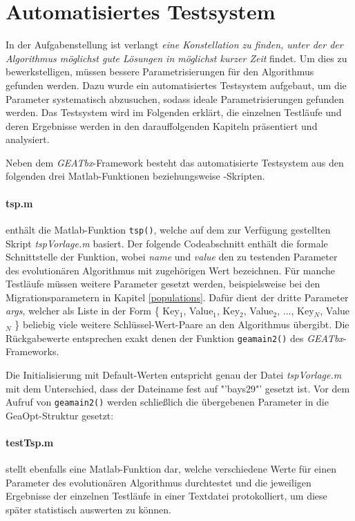 \section{Automatisiertes Testsystem}\label{testsystem}

In der Aufgabenstellung \cite{aufg} ist verlangt \emph{eine Konstellation zu finden,
unter der der Algorithmus möglichst gute Lösungen in möglichst kurzer Zeit} findet.
Um dies zu bewerkstelligen, müssen bessere Parametrisierungen für den Algorithmus
gefunden werden. Dazu wurde ein automatisiertes Testsystem aufgebaut, um
die Parameter systematisch abzusuchen, sodass ideale Parametrisierungen
gefunden werden. Das Testsystem wird im Folgenden erklärt, die einzelnen Testläufe
und deren Ergebnisse werden in den darauffolgenden Kapiteln präsentiert und
analysiert.

Neben dem \emph{GEATbx}-Framework besteht das automatisierte Testsystem aus den
folgenden drei Matlab-Funktionen beziehungsweise -Skripten.


\paragraph{tsp.m} enthält die Matlab-Funktion {\tt tsp()}, welche auf dem
zur Verfügung gestellten Skript \emph{tspVorlage.m} basiert. Der folgende
Codeabschnitt enthält die formale Schnittstelle der Funktion, wobei \emph{name}
und \emph{value} den zu testenden Parameter des evolutionären Algorithmus mit
zugehörigen Wert bezeichnen.
Für manche Testläufe müssen weitere Parameter gesetzt werden, beispielsweise
bei den Migrationsparametern in Kapitel \ref{populations}. Dafür dient der
dritte Parameter \emph{args}, welcher als Liste in der Form
\{ Key$_{1}$, Value$_{1}$, Key$_{2}$, Value$_{2}$, ..., Key$_{N}$, Value$_{N}$ \}
beliebig viele weitere Schlüssel-Wert-Paare an den Algorithmus übergibt.
Die Rückgabewerte entsprechen exakt denen der Funktion {\tt geamain2()} des
\emph{GEATbx}-Frameworks.



\noindent Die Initialisierung mit Default-Werten entspricht genau der Datei
\emph{tspVorlage.m} mit dem Unterschied, dass der Dateiname fest auf "'bays29"'
gesetzt ist. Vor dem Aufruf von {\tt geamain2()} werden schließlich die
übergebenen Parameter in die GeaOpt-Struktur gesetzt:



\paragraph{testTsp.m} stellt ebenfalls eine Matlab-Funktion dar, welche
verschiedene Werte für einen Parameter des evolutionären Algorithmus durchtestet
und die jeweiligen Ergebnisse der einzelnen Testläufe in einer Textdatei
protokolliert, um diese später statistisch auswerten zu können.


